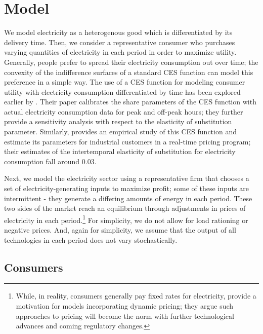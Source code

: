 \documentclass[11pt,a4paper]{extarticle}
\begin{document}



\section{Model}

We model electricity as a heterogenous good which is differentiated by its delivery time. Then, we consider a representative consumer who purchases varying quantities of electricity in each period in order to maximize utility. Generally, people prefer to spread their electricity consumption out over time; the convexity of the indifference surfaces of a standard CES function can model this preference in a simple way. The use of a CES function for modeling consumer utility with electricity consumption differentiated by time has been explored earlier by \citet{Moha2016}. Their paper calibrates the share parameters of the CES function with actual electricity consumption data for peak and off-peak hours; they further provide a sensitivity analysis with respect to the elasticity of substitution parameter. Similarly, \citet{Schwarz} provides an empirical study of this CES function and estimate its parameters for industrial customers in a real-time pricing program; their estimates of the intertemporal elasticity of substitution for electricity consumption fall around 0.03. 

Next, we model the electricity sector using a representative firm that chooses a set of electricity-generating inputs to maximize profit; some of these inputs are intermittent - they generate a differing amounts of energy in each period. These two sides of the market reach an equilibrium through adjustments in prices of electricity in each period.\footnote{While, in reality, consumers generally pay fixed rates for electricity, \citeauthor{HH} provide a motivation for models incorporating dynamic pricing; they argue such approaches to pricing will become the norm with further technological advances and coming regulatory changes. } For simplicity, we do not allow for load rationing  or negative prices. And, again for simplicity, we assume that the output of all technologies in each period does not vary stochastically. 

\subsection{Consumers}
\end{document}
